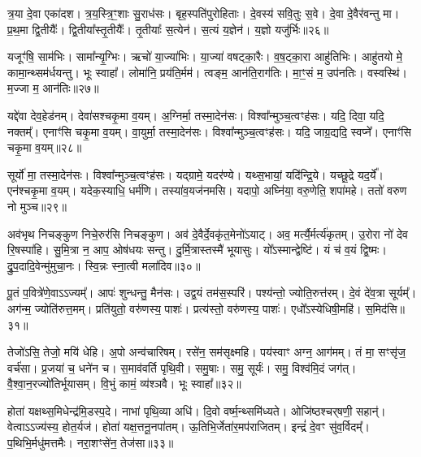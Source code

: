 त्र॒या दे॒वा एका॑दश।
त्र॒य॒स्त्रि॒ꣳ॒शाः सु॒राध॑सः।
बृह॒स्पति॑पुरो\-हिताः।
दे॒वस्य॑ सवि॒तुः स॒वे।
दे॒वा दे॒वैर॑वन्तु मा।
प्र॒थ॒मा द्वि॒तीयैः᳚।
द्वि॒तीया᳚स्तृ॒तीयैः᳚।
तृ॒तीयाः᳚ स॒त्येन॑।
स॒त्यं य॒ज्ञेन॑।
य॒ज्ञो यजु॑र्भिः॥२६॥

यजूꣳ॑षि॒ साम॑भिः।
सामा᳚न्यृ॒ग्भिः।
ऋचो॑ या॒ज्या॑भिः।
या॒ज्या॑ वषट्का॒रैः।
व॒ष॒ट्का॒रा आहु॑तिभिः।
आहु॑तयो मे॒ कामा॒न्थ्सम॑र्धयन्तु।
भूः स्वाहा᳚।
लोमा॑नि॒ प्रय॑ति॒र्मम॑।
त्वङ्म॒ आन॑ति॒राग॑तिः।
मा॒ꣳ॒सं म॒ उप॑नतिः।
वस्वस्थि॑।
म॒ज्जा म॒ आन॑तिः॥२७॥\anuvakamend[प॒स्त्या᳚स्वा सर॑स्वत्यै॒ भैष॑ज्येन॒ श्रीरङ्गा॑नि भ॒सद्य॒ज्ञे य॒ज्ञो यजु॑र्भि॒रुप॑नति॒र्द्वे च॑]

यद्दे॑वा देव॒हेड॑नम्।
देवा॑सश्चकृ॒मा व॒यम्।
अ॒ग्निर्मा॒ तस्मा॒देन॑सः।
विश्वा᳚न्मुञ्च॒त्वꣳह॑सः।
यदि॒ दिवा॒ यदि॒ नक्तम्᳚।
एनाꣳ॑सि चकृ॒मा व॒यम्।
वा॒युर्मा॒ तस्मा॒देन॑सः।
विश्वा᳚न्मुञ्च॒त्वꣳह॑सः।
यदि॒ जाग्र॒द्यदि॒ स्वप्ने᳚।
एनाꣳ॑सि चकृ॒मा व॒यम्॥२८॥

सूर्यो॑ मा॒ तस्मा॒देन॑सः।
विश्वा᳚न्मुञ्च॒त्वꣳह॑सः।
यद्ग्रामे॒ यदर॑ण्ये।
यथ्स॒भायां॒ यदि॑न्द्रि॒ये।
यच्छू॒द्रे यद॒र्ये᳚।
एन॑श्चकृ॒मा व॒यम्।
यदेक॒स्याधि॒ धर्म॑णि।
तस्या॑व॒यज॑नमसि।
यदापो॒ अघ्नि॑या॒ वरु॒णेति॒ शपा॑महे।
ततो॑ वरुण नो मुञ्च॥२९॥

अव॑भृथ निचङ्कुण निचे॒रुर॑सि निचङ्कुण।
अव॑ दे॒वैर्दे॒वकृ॑त॒मेनो॑\-ऽयाट्।
अव॒ मर्त्यै॒र्मर्त्य॑कृतम्।
उ॒रोरा नो॑ देव रि॒षस्पा॑हि।
सु॒मि॒त्रा न॒ आप॒ ओष॑धयः सन्तु।
दु॒र्मि॒त्रास्तस्मै॑ भूयासुः।
यो᳚ऽस्मान्द्वेष्टि॑।
यं च॑ व॒यं द्वि॒ष्मः।
द्रु॒प॒दादि॒वेन्मु॑मुचा॒नः।
स्वि॒न्नः स्ना॒त्वी मला॑दिव॥३०॥

पू॒तं प॒वित्रे॑णे॒वाऽऽज्यम्᳚।
आपः॑ शुन्धन्तु॒ मैन॑सः।
उद्व॒यं तम॑स॒स्परि॑।
पश्य॑न्तो॒ ज्योति॒रुत्त॑रम्।
दे॒वं दे॑व॒त्रा सूर्यम्᳚।
अग॑न्म॒ ज्योति॑रुत्त॒मम्।
प्रति॑\-युतो॒ वरु॑णस्य॒ पाशः॑।
प्रत्य॑स्तो॒ वरु॑णस्य॒ पाशः॑।
एधो᳚ऽस्येधिषी॒महि॑।
स॒मिद॑सि॥३१॥

तेजो॑ऽसि॒ तेजो॒ मयि॑ धेहि।
अ॒पो अन्व॑चारिषम्।
रसे॑न॒ सम॑सृक्ष्महि।
पय॑स्वाꣳ अग्न॒ आग॑मम्।
तं मा॒ सꣳसृ॑ज॒ वर्च॑सा।
प्र॒जया॑ च॒ धने॑न च।
स॒माव॑वर्ति पृथि॒वी।
समु॒षाः।
समु॒ सूर्यः॑।
समु॒ विश्व॑मि॒दं जग॑त्।
वै॒श्वा॒न॒रज्यो॑तिर्भूयासम्।
वि॒भुं कामं॒ व्य॑श्ञवै।
भूः स्वाहा᳚॥३२॥\anuvakamend[स्वप्न॒ एनाꣳ॑सि चकृ॒मा व॒यं मु॑ञ्च॒ मला॑दिव स॒मिद॑सि॒ जग॒त्रीणि॑ च]

होता॑ यक्षथ्स॒मिधेन्द्र॑मि॒डस्प॒दे।
नाभा॑ पृथि॒व्या अधि॑।
दि॒वो वर्ष्म॒न्थ्समि॑ध्यते।
ओजि॑ष्ठश्चर्‌\mbox{}षणी॒ सहान्॑।
वेत्वा\-ऽ\-ऽ\-ज्य॑स्य॒ होत॒र्यज॑।
होता॑ यक्ष॒त्तनू॒नपा॑तम्।
ऊ॒तिभि॒र्जेता॑र॒मप॑राजितम्।
इन्द्रं॑ दे॒वꣳ सु॑व॒र्विदम्᳚।
प॒थिभि॒र्मधु॑मत्तमैः।
नरा॒शꣳसे॑न॒ तेज॑सा॥३३॥

